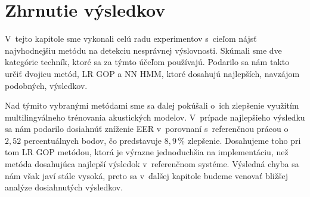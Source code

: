 
\section{Zhrnutie výsledkov}

V~tejto kapitole sme vykonali celú radu experimentov s~cieľom nájsť najvhodnejšiu metódu na detekciu nesprávnej výslovnosti. Skúmali sme dve kategórie techník, ktoré sa za týmto účeľom používajú. Podarilo sa nám takto určiť dvojicu metód, LR GOP a NN HMM, ktoré dosahujú najlepších, navzájom podobných, výsledkov. 

\noindent Nad týmito vybranými metódami sme sa ďalej pokúšali o~ich zlepšenie využitím multilingválneho trénovania akustických modelov. V~prípade najlepšieho výsledku sa nám podarilo dosiahnúť zníženie EER v~porovnaní s~referenčnou prácou o~$2{,}52$ percentuálnych bodov, čo predstavuje $8{,}9\,\%$ zlepšenie. Dosahujeme toho pri tom LR GOP metódou, ktorá je výrazne jednoduchšia na implementáciu, než metóda dosahujúca najlepší výsledok v~referenčnom systéme. Výsledná chyba sa nám však javí stále vysoká, preto sa v~ďalšej kapitole budeme venovať bližšej analýze dosiahnutých výsledkov.
